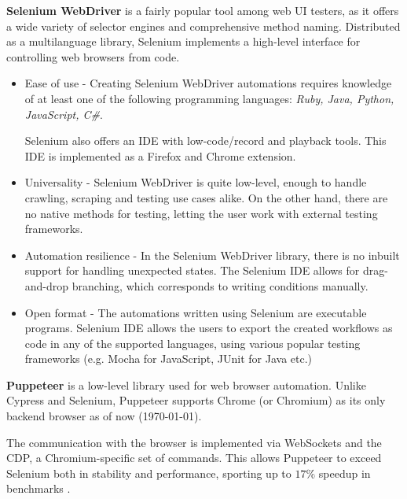 \textbf{Selenium WebDriver} is a fairly popular tool among web UI testers, as it offers a wide variety of selector engines and comprehensive method naming.
Distributed as a multilanguage library, Selenium implements a high-level interface for controlling web browsers from code.
\begin{itemize}
    \item Ease of use - Creating Selenium WebDriver automations requires knowledge of at least one of the following programming languages: \textit{Ruby, Java, Python, JavaScript, C\#}.
    
    Selenium also offers an \ac{IDE} with low-code/record and playback tools. This \ac{IDE} is implemented as a Firefox and Chrome extension.

    \item Universality - Selenium WebDriver is quite low-level, enough to handle crawling, scraping and testing use cases alike. 
    On the other hand, there are no native methods for testing, letting the user work with external testing frameworks.

    \item Automation resilience -
    In the Selenium WebDriver library, there is no inbuilt support for handling unexpected states.
    The Selenium IDE allows for drag-and-drop branching, which corresponds to writing conditions manually. 
    \item Open format - The automations written using Selenium are executable programs. 
    Selenium IDE allows the users to export the created workflows as code in any of the supported languages, using various popular testing frameworks (e.g. Mocha for JavaScript, JUnit for Java etc.)
\end{itemize}


\textbf{Puppeteer} is a low-level library used for web browser automation. 
Unlike Cypress and Selenium, Puppeteer supports Chrome (or Chromium) as its only backend browser as of now (\today).

The communication with the browser is implemented via WebSockets and the \ac{CDP}, a Chromium-specific set of commands.
This allows Puppeteer to exceed Selenium both in stability and performance, sporting up to $17\%$ speedup in benchmarks .

